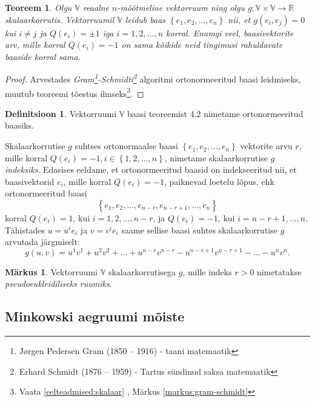 \documentclass[a4paper,12pt]{article}
\theoremstyle{plain}
\newtheorem{teoreem}{Teoreem}[section]
\theoremstyle{definition}
\newtheorem{definitsioon}{Definitsioon}[section]
\newtheorem{markus}{Märkus}[section]
\numberwithin{equation}{section}
\begin{document}
\begin{teoreem}
Olgu $\mathbb{V}$ reaalne $n$-mõõtmeline vektorruum ning olgu $g : \mathbb{V} \times \mathbb{V} \rightarrow \mathbb{R}$ skalaarkorrutis. Vektorruumil $\mathbb{V}$ leidub baas $\left\lbrace e_1, e_2, \dots, e_n \right\rbrace$ nii, et $g \left(e_i, e_j\right) = 0$ kui $i \neq j$ ja $Q\left(e_i\right) = \pm 1$ iga $i = 1, 2, \dots, n$ korral. Enamgi veel, baasivektorite arv, mille korral $Q \left(e_i\right) = -1$ on sama kõikide neid tingimusi rahuldavate baaside korral sama.
\end{teoreem}

\begin{proof}
Arvestades \textit{Gram\footnote{Jørgen Pedersen Gram (1850 – 1916) - taani matemaatik}-Schmidti\footnote{Erhard Schmidt (1876 – 1959) - Tartus sündinud saksa matemaatik}} algoritmi ortonormeeritud baasi leidmiseks, muutub teoreemi tõestus ilmseks\footnote{Vaata \ref{eelteadmised:skalaar} , Märkus \ref{markus:gram-schmidt}}.
\end{proof}

\begin{definitsioon}
Vektorruumi $\mathbb{V}$ baasi teoreemist 4.2 nimetame ortonormeeritud baasiks.
\end{definitsioon}

Skalaarkorrutise $g$ suhtses ortonormaalse baasi $\left\lbrace e_1, e_2, \dots, e_n \right\rbrace$ vektorite arvu $r$, mille korral $Q \left(e_i\right) = -1, i \in \left\lbrace 1, 2, \dots, n \right\rbrace$, nimetame skalaarkorrutise $g$ \emph{indeksiks}.
Edasises eeldame, et ortonormeeritud baasid on indekseeritud nii, et baasivektorid $e_i$, mille korral $Q \left(e_i\right) = -1$, paiknevad loetelu lõpus, ehk ortonormeeritud baasi 
\[\left\lbrace e_1, e_2, \dots, e_{n-r}, e_{n-r+1}, \dots, e_n \right\rbrace\]
korral $Q \left(e_i\right) = 1$, kui $i = 1, 2, \dots, n-r$, ja $Q \left(e_i\right) = -1$, kui $i = n-r+1, \dots, n$. Tähistades $u = u^i e_i$ ja $v = v^i e_i$ saame sellise baasi suhtes skalaarkorrutise $g$ arvutada järgmiselt:
\[g\left(u, v\right) = u^1 v^1 + u^2 v^2 + \dots + u^{n-r} v^{n-r} - u^{n-r+1} v^{n-r+1} - \dots - u^n v^n.\]

\begin{markus}
Vektorruumi $\mathbb{V}$ skalaarkorrutisega $g$, mille indeks $r > 0$ nimetatakse \emph{pseudoeukleidiliseks ruumiks}.
\end{markus}


\subsection{Minkowski aegruumi mõiste}
\end{document}
